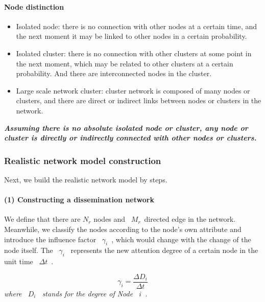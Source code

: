 \documentclass[a4paper,11pt]{article}
\begin{document}
\paragraph{Node distinction}
\text{\\}
\begin{itemize}
\item Isolated node: there is no connection with other nodes at a certain time, and the next moment it may be linked to other nodes in a certain probability.
\item Isolated cluster: there is no connection with other clusters at some point in the next moment, which may be related to other clusters at a certain probability. And there are interconnected nodes in the cluster.
\item Large scale network cluster: cluster network is composed of many nodes or clusters, and there are direct or indirect links between nodes or clusters in the network.
\end{itemize}
\textbf{\emph{Assuming there is no absolute isolated node or cluster, any node or cluster is directly or indirectly connected with other nodes or clusters.}}



\subsubsection{Realistic network model construction}
\par Next, we build the realistic network model by steps.
\paragraph{(1) Constructing a dissemination network}
\text{\\}
\par We define that there are $N_r$ nodes and ~$M_r$~directed edge in the network. Meanwhile, we classify the nodes according to the node's own attribute and introduce the influence factor ~$\gamma _i$~, which would change with the change of the node itself. The ~$\gamma _i$~ represents the new attention degree of a certain node in the unit time ~$\Delta t$~.

\begin{equation}
\gamma _i=\frac{\Delta D_i}{\Delta t}
\end{equation}
\emph{where ~$D_i$~ stands for the degree of Node ~$i$~.}
\end{document}
